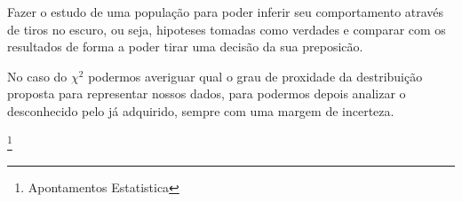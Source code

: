 Fazer o estudo de uma população para poder inferir seu comportamento através de tiros no escuro, ou seja, hipoteses tomadas como verdades e comparar com os resultados de forma a poder tirar uma decisão da sua preposicão.

No caso do $\chi^2$ podermos averiguar qual o grau de proxidade da destribuição proposta para representar nossos dados, para podermos depois analizar o desconhecido pelo já adquirido, sempre com uma margem de incerteza.







%
%
%
\listoffigures
\cite{*}

\footnote{Apontamentos Estatistica}

